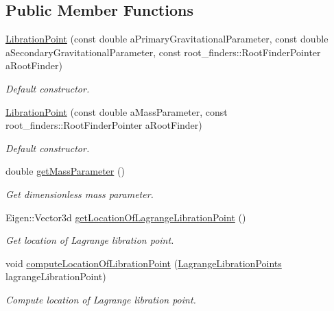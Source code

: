 \subsection*{Public Member Functions}
\begin{DoxyCompactItemize}
\item 
\hyperlink{classtudat_1_1gravitation_1_1circular__restricted__three__body__problem_1_1LibrationPoint_ab8cfd514459d7d758d54626058cb5d10}{Libration\+Point} (const double a\+Primary\+Gravitational\+Parameter, const double a\+Secondary\+Gravitational\+Parameter, const root\+\_\+finders\+::\+Root\+Finder\+Pointer a\+Root\+Finder)\hypertarget{classtudat_1_1gravitation_1_1circular__restricted__three__body__problem_1_1LibrationPoint_ab8cfd514459d7d758d54626058cb5d10}{}\label{classtudat_1_1gravitation_1_1circular__restricted__three__body__problem_1_1LibrationPoint_ab8cfd514459d7d758d54626058cb5d10}

\begin{DoxyCompactList}\small\item\em Default constructor. \end{DoxyCompactList}\item 
\hyperlink{classtudat_1_1gravitation_1_1circular__restricted__three__body__problem_1_1LibrationPoint_a50d214a8cc85b5d56ece50234830b81d}{Libration\+Point} (const double a\+Mass\+Parameter, const root\+\_\+finders\+::\+Root\+Finder\+Pointer a\+Root\+Finder)
\begin{DoxyCompactList}\small\item\em Default constructor. \end{DoxyCompactList}\item 
double \hyperlink{classtudat_1_1gravitation_1_1circular__restricted__three__body__problem_1_1LibrationPoint_aa67e55f3d0b60b3e70a630f4569d81ac}{get\+Mass\+Parameter} ()
\begin{DoxyCompactList}\small\item\em Get dimensionless mass parameter. \end{DoxyCompactList}\item 
Eigen\+::\+Vector3d \hyperlink{classtudat_1_1gravitation_1_1circular__restricted__three__body__problem_1_1LibrationPoint_a95282e2dc3cb4a7ae4d278469dabc82d}{get\+Location\+Of\+Lagrange\+Libration\+Point} ()
\begin{DoxyCompactList}\small\item\em Get location of Lagrange libration point. \end{DoxyCompactList}\item 
void \hyperlink{classtudat_1_1gravitation_1_1circular__restricted__three__body__problem_1_1LibrationPoint_a0b4e0d0015a41964210f605dd2ab018d}{compute\+Location\+Of\+Libration\+Point} (\hyperlink{classtudat_1_1gravitation_1_1circular__restricted__three__body__problem_1_1LibrationPoint_a5214173f012fc769e5c89dba4fd2c741}{Lagrange\+Libration\+Points} lagrange\+Libration\+Point)
\begin{DoxyCompactList}\small\item\em Compute location of Lagrange libration point. \end{DoxyCompactList}\end{DoxyCompactItemize}


